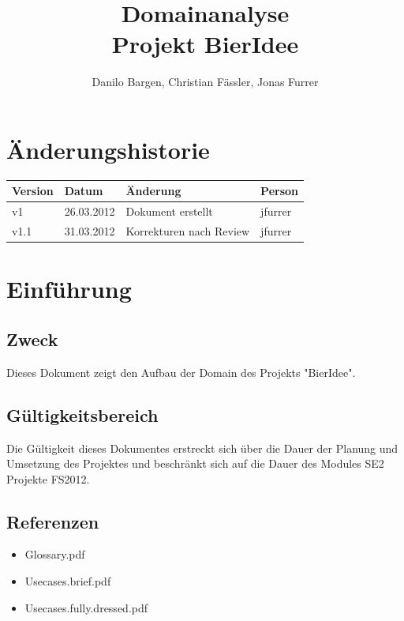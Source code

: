 \documentclass[10pt,a4paper]{scrartcl}
\author{Danilo Bargen, Christian Fässler, Jonas Furrer}
\title{Domainanalyse\\Projekt BierIdee}
\begin{document}
\begin{titlepage}
	\maketitle
	\vspace{120mm}
	\thispagestyle{empty} %
\end{titlepage}

\tableofcontents
\newpage

\section{Änderungshistorie}
\begin{tabular}{p{}p{}p{}p{}}
\toprule
\textbf{Version} & \textbf{Datum} & \textbf{Änderung} & \textbf{Person} \\  
\midrule
v1 & 26.03.2012 & Dokument erstellt & jfurrer \\  
\hline 
v1.1 & 31.03.2012 & Korrekturen nach Review & jfurrer \\
\bottomrule
\end{tabular} 
\newpage

\section{Einführung}
\subsection{Zweck}
Dieses Dokument zeigt den Aufbau der Domain des Projekts "BierIdee".

\subsection{Gültigkeitsbereich}
Die Gültigkeit dieses Dokumentes erstreckt sich über die Dauer der Planung und Umsetzung des Projektes und beschränkt sich auf die Dauer des Modules SE2 Projekte FS2012.

\subsection{Referenzen}
\begin{itemize}
	\item Glossary.pdf
	\item Usecases.brief.pdf
	\item Usecases.fully.dressed.pdf
\end{itemize}
\end{document}
